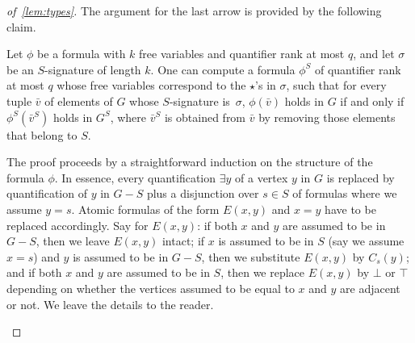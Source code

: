 \begin{proof}[of~\cref{lem:types}]
\medskip

The argument for the last arrow is provided by the following claim.

\begin{claim}\label{cl:rewrite}
  Let $\phi$ be a formula
  with $k$ free variables and quantifier rank at most $q$, 
  and let $\sigma$ be an $S$-signature of length $k$.
  One can compute a formula $\phi^S$ of quantifier rank at most $q$
  whose free variables correspond to the $\star$'s in $\sigma$,
  such that for every tuple $\bar v$ of elements of $G$
  whose $S$-signature is~$\sigma$,
   $\phi(\bar v)$ holds in $G$
  if and only if $\phi^S(\bar v^S)$ holds in $G^S$, where $\bar v^S$ is obtained from $\bar v$ by removing 
  those elements that belong to $S$.
\end{claim}
\begin{clproof}[Sketch]
The proof proceeds by a straightforward induction on the structure of the formula $\phi$.
In essence, every quantification $\exists y$ of a vertex $y$ in $G$ is replaced by quantification of $y$ in $G-S$ plus a disjunction over $s\in S$ of formulas where we assume $y=s$.
Atomic formulas of the form $E(x,y)$ and $x=y$ have to be replaced accordingly. Say for $E(x,y)$: if both $x$ and $y$ are assumed to be in $G-S$, then we leave $E(x,y)$ intact;
if $x$ is assumed to be in $S$ (say we assume $x=s$) and $y$ is assumed to be in $G-S$, then we substitute $E(x,y)$ by $C_s(y)$; and if both $x$ and $y$ are assumed to be in $S$, then 
we replace $E(x,y)$ by $\bot$ or $\top$ depending on whether the vertices assumed to be equal to $x$ and $y$ are adjacent or not.
We leave the details to the reader.
\end{clproof}
\begin{comment}
\begin{clproof}
The proof proceeds by induction on the structure of the formula $\phi$. 

If $\phi$ is an atomic formula $E(x,x')$ or $x=x'$, then the formula $\phi^S$ is constructed by case analysis. If $\alpha(x),\alpha(x')\in Y$ then $\phi^S$
is obtained from $\phi$ by substituting the variables $x,x'$ with variables from $Y$ according to~$\alpha$. If  $\alpha(x),\alpha(x')\in S$ then $\phi'$ is the truth value $\bot$ or $\top$ of 
the formula $\phi$ in the graph $G$ under the valuation which maps $x$ to $\alpha(x)$ and $x'$ to $\alpha(x')$. 
Finally, suppose that $\alpha(x)=y\in Y$ and $\alpha(x')=s\in S$. If $\phi$ is $E(x,x')$ then $\phi'$ is the formula $C_{s}(y)$, and if $\phi$ is $x=x'$ then $\phi'$ is the formula $\bot$.
 

\end{comment}
\end{proof}
